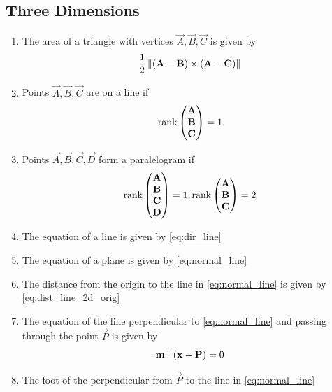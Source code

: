 \documentclass[journal,12pt,twocolumn]{IEEEtran}
\renewcommand\thesection{\arabic{section}}
\renewcommand\thesubsection{\thesection.\arabic{subsection}}
\begin{document}
\subsection{Three Dimensions}
\renewcommand{\theequation}{\theenumi}
\begin{enumerate}[label=\thesubsection.\arabic*.,ref=\thesubsection.\theenumi]
\item The area of a triangle with vertices $\vec{A}, \vec{B}, \vec{C}$ is given by 
\begin{align}
  \label{eq:area3d}
 \frac{1}{2} \left\lVert\left(\mathbf{A} - \mathbf{B}\right) \times \left(\mathbf{A} - \mathbf{C}\right)\right\rVert
\end{align}

\item Points $\vec{A}, \vec{B}, \vec{C}$ are on a line if 
\begin{align}
  \label{eq:line_rank}
  \text{rank}\begin{pmatrix}\mathbf{A} \\ \mathbf{B} \\ \mathbf{C} \end{pmatrix}  = 1
\end{align}
\item Points $\vec{A}, \vec{B}, \vec{C}, \vec{D}$ form a paralelogram if 
\begin{align}
  \label{eq:parallelgm_rank}
  \text{rank}\begin{pmatrix}\mathbf{A} \\ \mathbf{B} \\ \mathbf{C} \\ \mathbf{D}  \end{pmatrix}  = 1, 
  \text{rank}\begin{pmatrix}\mathbf{A} \\ \mathbf{B} \\ \mathbf{C} \end{pmatrix}  = 2
\end{align}
\item The equation of a line  is given by  
	\eqref{eq:dir_line}
	\item The equation of a plane is given by
	\eqref{eq:normal_line}
	\item The distance from the origin to the line  in 
	\eqref{eq:normal_line}
	is given by 
	\eqref{eq:dist_line_2d_orig}
\item The equation of the line perpendicular to 
	\eqref{eq:normal_line}
		and passing through the point $\vec{P}$ is given by 
\begin{align}
	\mathbf{m}^{\top}\left(\mathbf{x}-\mathbf{P}\right)  = 0
\end{align}
\item The foot of the perpendicular from $\vec{P}$ to the line in 
	\eqref{eq:normal_line}

\end{enumerate}
\end{document}
